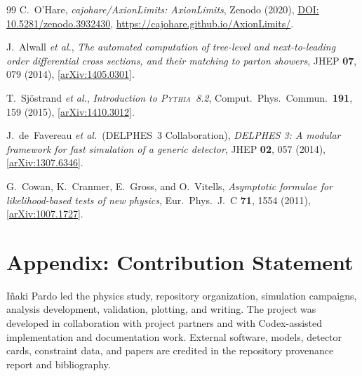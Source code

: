 \documentclass[12pt,a4paper]{article}
\begin{document}
\begin{thebibliography}{99}
C.~O'Hare,
\textit{cajohare/AxionLimits: AxionLimits},
Zenodo (2020),
\href{https://doi.org/10.5281/zenodo.3932430}{DOI: 10.5281/zenodo.3932430},
\url{https://cajohare.github.io/AxionLimits/}.

J.~Alwall \textit{et al.},
\textit{The automated computation of tree-level and next-to-leading order differential
cross sections, and their matching to parton showers},
JHEP \textbf{07}, 079 (2014),
[\href{https://arxiv.org/abs/1405.0301}{arXiv:1405.0301}].

T.~Sjöstrand \textit{et al.},
\textit{Introduction to \textsc{Pythia}~8.2},
Comput.\ Phys.\ Commun.\ \textbf{191}, 159 (2015),
[\href{https://arxiv.org/abs/1410.3012}{arXiv:1410.3012}].

J.~de~Favereau \textit{et al.}\ (DELPHES~3 Collaboration),
\textit{DELPHES 3: A modular framework for fast simulation of a generic detector},
JHEP \textbf{02}, 057 (2014),
[\href{https://arxiv.org/abs/1307.6346}{arXiv:1307.6346}].

G.~Cowan, K.~Cranmer, E.~Gross, and O.~Vitells,
\textit{Asymptotic formulae for likelihood-based tests of new physics},
Eur.\ Phys.\ J.\ C \textbf{71}, 1554 (2011),
[\href{https://arxiv.org/abs/1007.1727}{arXiv:1007.1727}].

\end{thebibliography}

\appendix
\section*{Appendix: Contribution Statement}

Iñaki Pardo led the physics study, repository organization, simulation
campaigns, analysis development, validation, plotting, and writing. The project
was developed in collaboration with project partners and with Codex-assisted
implementation and documentation work. External software, models, detector
cards, constraint data, and papers are credited in the repository provenance
report and bibliography.
\end{document}
